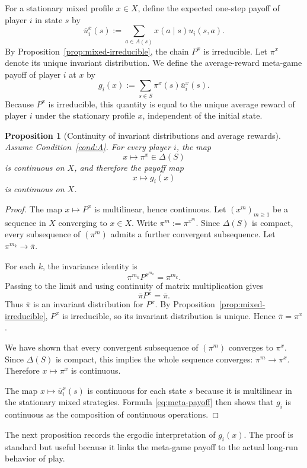 \documentclass[11pt]{article}
\newtheorem{proposition}[theorem]{Proposition}
\theoremstyle{definition}
\newcommand{\1}{\mathbf{1}}
\begin{document}
For a stationary mixed profile $x\in X$, define the expected one-step payoff of player $i$ in state $s$ by
\[
\bar u_i^x(s):=\sum_{a\in A(s)}x(a\mid s)u_i(s,a).
\]
By Proposition~\ref{prop:mixed-irreducible}, the chain $P^x$ is irreducible. Let $\pi^x$ denote its unique invariant distribution. We define the average-reward meta-game payoff of player $i$ at $x$ by
\begin{equation}\label{eq:meta-payoff}
g_i(x):=\sum_{s\in S}\pi^x(s)\bar u_i^x(s).
\end{equation}
Because $P^x$ is irreducible, this quantity is equal to the unique average reward of player $i$ under the stationary profile $x$, independent of the initial state.

\begin{proposition}[Continuity of invariant distributions and average rewards]\label{prop:continuity}
Assume Condition~\ref{cond:A}. For every player $i$, the map
\[
x\longmapsto \pi^x\in \Delta(S)
\]
is continuous on $X$, and therefore the payoff map
\[
x\longmapsto g_i(x)
\]
is continuous on $X$.
\end{proposition}

\begin{proof}
The map $x\mapsto P^x$ is multilinear, hence continuous. Let $(x^m)_{m\ge1}$ be a sequence in $X$ converging to $x\in X$. Write $\pi^m:=\pi^{x^m}$. Since $\Delta(S)$ is compact, every subsequence of $(\pi^m)$ admits a further convergent subsequence. Let $\pi^{m_k}\to \bar\pi$.

For each $k$, the invariance identity is
\[
\pi^{m_k}P^{x^{m_k}}=\pi^{m_k}.
\]
Passing to the limit and using continuity of matrix multiplication gives
\[
\bar\pi P^x=\bar\pi.
\]
Thus $\bar\pi$ is an invariant distribution for $P^x$. By Proposition~\ref{prop:mixed-irreducible}, $P^x$ is irreducible, so its invariant distribution is unique. Hence $\bar\pi=\pi^x$.

We have shown that every convergent subsequence of $(\pi^m)$ converges to $\pi^x$. Since $\Delta(S)$ is compact, this implies the whole sequence converges: $\pi^m\to \pi^x$. Therefore $x\mapsto \pi^x$ is continuous.

The map $x\mapsto \bar u_i^x(s)$ is continuous for each state $s$ because it is multilinear in the stationary mixed strategies. Formula \eqref{eq:meta-payoff} then shows that $g_i$ is continuous as the composition of continuous operations.
\end{proof}

The next proposition records the ergodic interpretation of $g_i(x)$. The proof is standard but useful because it links the meta-game payoff to the actual long-run behavior of play.
\end{document}
